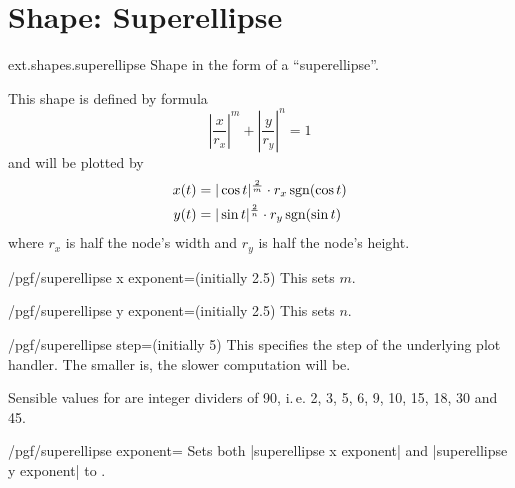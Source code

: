 %
%
%
\section{Shape: Superellipse}
\begin{pgflibrary}{ext.shapes.superellipse}
  Shape in the form of a ``superellipse''.
\end{pgflibrary}

This shape is defined by formula
\begin{equation*}
  \left|\frac x{r_x}\right|^m + \left|\frac y{r_y}\right|^n = 1
\end{equation*}
and will be plotted by
\begin{align*}
  x(t) &= |\cos t|^{\frac 2m} \cdot r_x \operatorname{sgn}(\cos t) \\
  y(t) &= |\sin t|^{\frac 2n} \cdot r_y \operatorname{sgn}(\sin t) \\
\end{align*}
where $r_x$ is half the node's width and $r_y$ is half the node's height.

\begin{key}{/pgf/superellipse x exponent=(initially 2.5)}
This sets $m$.
\end{key}
\begin{key}{/pgf/superellipse y exponent=(initially 2.5)}
This sets $n$.
\end{key}
\begin{key}{/pgf/superellipse step=(initially 5)}
This specifies the step of the underlying plot handler.
The smaller  is, the slower computation will be.

Sensible values for  are integer dividers of 90, i.\,e.
2, 3, 5, 6, 9, 10, 15, 18, 30 and 45.
\end{key}
\begin{key}{/pgf/superellipse exponent=}
  Sets both |superellipse x exponent| and |superellipse y exponent| to .
\end{key}

